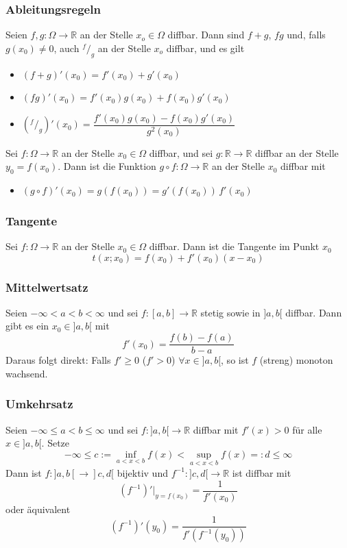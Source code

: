 \documentclass[6pt]{article}
\begin{document}
\begin{multicols*}{3}
	\subsubsection*{Ableitungsregeln}
		Seien $f,g:\Omega \to \mathbb{R}$ an der Stelle $x_o \in \Omega$ diffbar. Dann sind $f+g$, $f g$ und, falls $g(x_0) \neq 0$, auch $^f/_g$ an
		der Stelle $x_o$ diffbar, und es gilt
		\begin{itemize}
			\item $(f+g)'(x_0) = f'(x_0) + g'(x_0)$
			\item $(f g)'(x_0) = f'(x_0) g(x_0) + f(x_0) g'(x_0)$
			\item $(^f/_g)'(x_0) = \dfrac{f'(x_0) g(x_0) - f(x_0) g'(x_0)}{g^2(x_0)}$
		\end{itemize}
		
		Sei $f: \Omega \to \mathbb{R}$ an der Stelle $x_0 \in \Omega$ diffbar, und sei $g: \mathbb{R} \to \mathbb{R}$ diffbar an der Stelle $y_0 = f(x_0)$.
		Dann ist die Funktion $g \circ f:\Omega \to \mathbb{R}$ an der Stelle $x_0$ diffbar mit
		\begin{itemize}
			\item $(g \circ f)'(x_0) = g(f(x_0)) = g'(f(x_0)) \, f'(x_0)$	
		\end{itemize}
	
	
	\subsubsection*{Tangente}
		Sei $f: \Omega \to \mathbb{R}$ an der Stelle $x_0 \in \Omega$ diffbar. Dann ist die Tangente im Punkt $x_0$
		\[ t(x; x_0)=f(x_0)+f'(x_0)(x-x_0) \]
		
	\subsubsection*{Mittelwertsatz}
		Seien $-\infty < a < b < \infty$ und sei $f:[a,b] \to \mathbb{R}$ stetig sowie in $]a,b[$ diffbar. Dann gibt es ein $x_0 \in ]a,b[$ mit
		\[ f'(x_0)=\frac{f(b)-f(a)}{b-a} \]
		Daraus folgt direkt: Falls $f' \geq 0$ ($f' > 0$) $ \forall x \in ]a,b[$, so ist $f$ (streng) monoton wachsend.

	\subsubsection*{Umkehrsatz}
		Seien $-\infty \leq a < b \leq \infty$ und sei $f:]a,b[ \to \mathbb{R}$ diffbar mit $f'(x) > 0$ f{\"u}r alle $x \in ]a,b[$. Setze
		\[ -\infty \leq c:= \inf_{a < x < b} f(x) < \sup_{a < x < b} f(x) =: d \leq \infty \]
		Dann ist $f: ]a,b[ \to ]c,d[$ bijektiv und $f^{-1} : ]c,d[ \to \mathbb{R}$ ist diffbar mit
		\[ \left( f^{-1} \right)' |_{y = f(x_0)} = \frac{1}{f'(x_0)} \]
		oder {\"a}quivalent
		\[ \left(f^{-1}\right)'(y_0) = \frac{1}{f'(f^{-1}(y_0))} \]
	

\end{multicols*}
\end{document}
